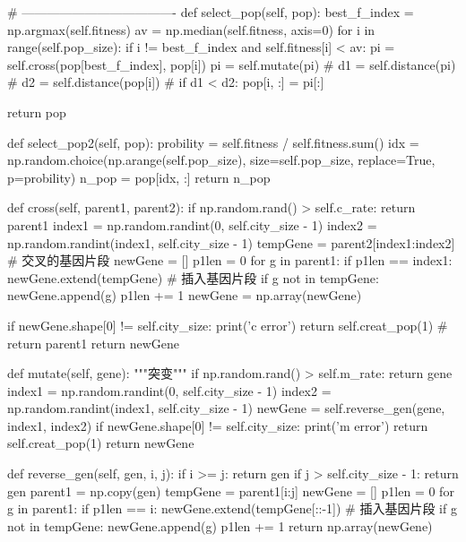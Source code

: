 \documentclass{ctexart}
\begin{document}
\begin{python}
    # -------------------------------------
    def select_pop(self, pop):
        best_f_index = np.argmax(self.fitness)
        av = np.median(self.fitness, axis=0)
        for i in range(self.pop_size):
            if i != best_f_index and self.fitness[i] < av:
                pi = self.cross(pop[best_f_index], pop[i])
                pi = self.mutate(pi)
                # d1 = self.distance(pi)
                # d2 = self.distance(pop[i])
                # if d1 < d2:
                pop[i, :] = pi[:]

        return pop

    def select_pop2(self, pop):
        probility = self.fitness / self.fitness.sum()
        idx = np.random.choice(np.arange(self.pop_size), size=self.pop_size, replace=True, p=probility)
        n_pop = pop[idx, :]
        return n_pop

    def cross(self, parent1, parent2):
        if np.random.rand() > self.c_rate:
            return parent1
        index1 = np.random.randint(0, self.city_size - 1)
        index2 = np.random.randint(index1, self.city_size - 1)
        tempGene = parent2[index1:index2]  # 交叉的基因片段
        newGene = []
        p1len = 0
        for g in parent1:
            if p1len == index1:
                newGene.extend(tempGene)  # 插入基因片段
            if g not in tempGene:
                newGene.append(g)
            p1len += 1
        newGene = np.array(newGene)

        if newGene.shape[0] != self.city_size:
            print('c error')
            return self.creat_pop(1)
            # return parent1
        return newGene

    def mutate(self, gene):
        """突变"""
        if np.random.rand() > self.m_rate:
            return gene
        index1 = np.random.randint(0, self.city_size - 1)
        index2 = np.random.randint(index1, self.city_size - 1)
        newGene = self.reverse_gen(gene, index1, index2)
        if newGene.shape[0] != self.city_size:
            print('m error')
            return self.creat_pop(1)
        return newGene

    def reverse_gen(self, gen, i, j):
        if i >= j:
            return gen
        if j > self.city_size - 1:
            return gen
        parent1 = np.copy(gen)
        tempGene = parent1[i:j]
        newGene = []
        p1len = 0
        for g in parent1:
            if p1len == i:
                newGene.extend(tempGene[::-1])  # 插入基因片段
            if g not in tempGene:
                newGene.append(g)
            p1len += 1
        return np.array(newGene)


\end{python}
\end{document}
